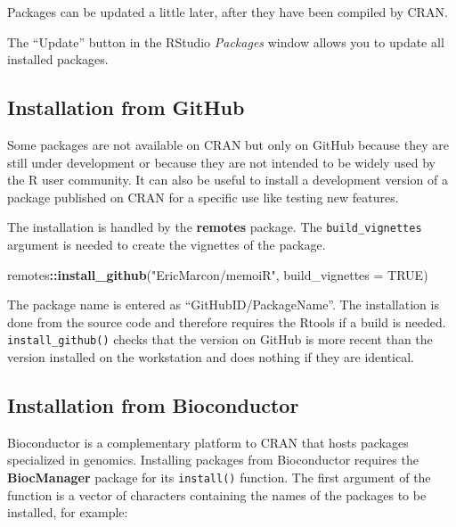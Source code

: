 \documentclass[
  12pt,
  american,
  a4paper,
  extrafontsizes,onecolumn,openright
  ]{memoir}
\newenvironment{Shaded}{\begin{snugshade}}{\end{snugshade}}
\newcommand{\AttributeTok}[1]{\textcolor[rgb]{0.13,0.29,0.53}{#1}}
\newcommand{\ConstantTok}[1]{\textcolor[rgb]{0.56,0.35,0.01}{#1}}
\newcommand{\FunctionTok}[1]{\textcolor[rgb]{0.13,0.29,0.53}{\textbf{#1}}}
\newcommand{\NormalTok}[1]{#1}
\newcommand{\SpecialCharTok}[1]{\textcolor[rgb]{0.81,0.36,0.00}{\textbf{#1}}}
\newcommand{\StringTok}[1]{\textcolor[rgb]{0.31,0.60,0.02}{#1}}
\begin{document}
Packages can be updated a little later, after they have been compiled by CRAN.

The \enquote{Update} button in the RStudio \emph{Packages} window allows you to update all installed packages.

\subsection{Installation from GitHub}\label{installation-from-github}

Some packages are not available on CRAN but only on GitHub because they are still under development or because they are not intended to be widely used by the R user community.
It can also be useful to install a development version of a package published on CRAN for a specific use like testing new features.

The installation is handled by the \textbf{remotes} package.
The \texttt{build\_vignettes} argument is needed to create the vignettes of the package.

\scriptsize

\begin{Shaded}
\begin{Highlighting}[]
\NormalTok{remotes}\SpecialCharTok{::}\FunctionTok{install\_github}\NormalTok{(}\StringTok{"EricMarcon/memoiR"}\NormalTok{, }\AttributeTok{build\_vignettes =} \ConstantTok{TRUE}\NormalTok{)}
\end{Highlighting}
\end{Shaded}

\normalsize

The package name is entered as \enquote{GitHubID/PackageName}.
The installation is done from the source code and therefore requires the Rtools if a build is needed.
\texttt{install\_github()} checks that the version on GitHub is more recent than the version installed on the workstation and does nothing if they are identical.

\subsection{Installation from Bioconductor}\label{installation-from-bioconductor}

Bioconductor is a complementary platform to CRAN that hosts packages specialized in genomics.
Installing packages from Bioconductor requires the \textbf{BiocManager} package for its \texttt{install()} function.
The first argument of the function is a vector of characters containing the names of the packages to be installed, for example:
\end{document}
